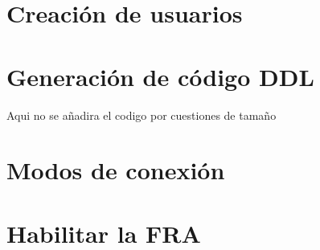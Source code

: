 \documentclass[journal]{IEEEtran}
\begin{document}
\section{Creación de usuarios}

\section{Generación de código DDL}
Aqui no se añadira el codigo por cuestiones de tamaño
\section{Modos de conexión}

\section{Habilitar la FRA}

\ifCLASSOPTIONcaptionsoff
  \newpage

\fi
\end{document}
